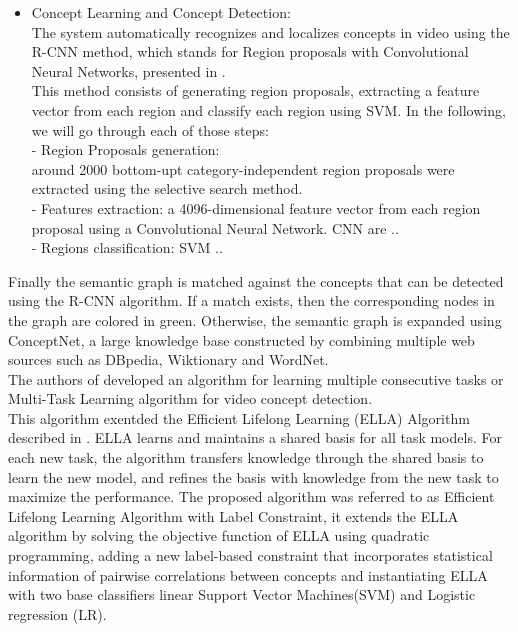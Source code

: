 \begin{itemize}
	 \item Concept Learning and Concept Detection: \\ 
	  	The system  automatically recognizes and localizes concepts in video using the R-CNN method, which stands for Region proposals with Convolutional Neural Networks, presented in \cite{a:rcnn}. \\ This method consists of generating region proposals, extracting a feature vector from each region and classify each region using SVM. In the following, we will go through each of those steps: \\
	 - Region Proposals generation: \\
	 around 2000 bottom-upt category-independent region proposals were extracted using the selective search method. 
\cite{a:J. Uijlings, K. van de Sande, T. Gevers, and A. Smeulders. Selective
search for object recognition.IJCV, 2013.}\\
	 - Features extraction:
	 a 4096-dimensional feature vector from each region proposal using a Convolutional Neural Network.
	 CNN  are ..\\
	 - Regions classification:
	 SVM ..
	  	
	  	 
	 
	
\end{itemize}
Finally the semantic graph is matched against the concepts that can be detected using the R-CNN algorithm. If a match exists, then the corresponding nodes in the graph are colored in green. Otherwise, the semantic graph is expanded using ConceptNet, a large knowledge base constructed by combining multiple web sources such  as DBpedia, Wiktionary and WordNet.\\
The authors of \cite{a:online} developed an algorithm for learning multiple consecutive tasks or Multi-Task Learning algorithm for video concept detection.\\ This algorithm exentded the Efficient Lifelong Learning (ELLA) Algorithm described in \cite{a:ella}. ELLA learns and maintains a shared basis for all task models. For each new task, the algorithm transfers knowledge through the shared basis to learn the new model, and refines the basis with knowledge from the new task to maximize the performance. The proposed algorithm was referred to as Efficient Lifelong Learning Algorithm with Label Constraint, it extends the ELLA algorithm by solving the objective function of ELLA using quadratic programming, adding a new label-based constraint that incorporates statistical information of pairwise correlations between concepts and instantiating ELLA with two base classifiers linear Support Vector Machines(SVM) and Logistic regression (LR). 
